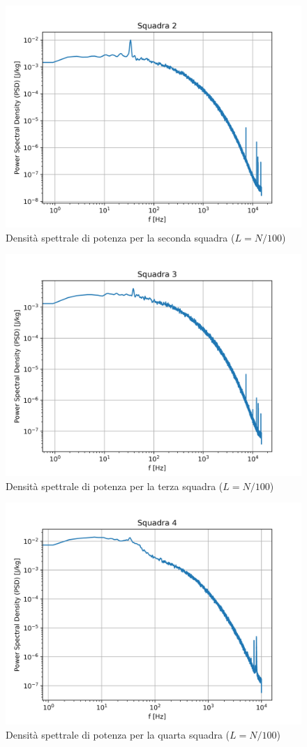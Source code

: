 \begin{figure}[H]
    \centering
    \includegraphics[width=.84\textwidth]{images/9/sq2timeserieswelchcl.png}
    \caption{Densità spettrale di potenza per la seconda squadra ($L=N/100$)}
\end{figure}

\begin{figure}[H]
    \centering
    \includegraphics[width=.84\textwidth]{images/9/sq3timeserieswelchcl.png}
    \caption{Densità spettrale di potenza per la terza squadra ($L=N/100$)}
\end{figure}

\begin{figure}[H]
    \centering
    \includegraphics[width=.73\textwidth]{images/9/sq4timeserieswelchcl.png}
    \caption{Densità spettrale di potenza per la quarta squadra ($L=N/100$)}
\end{figure}

